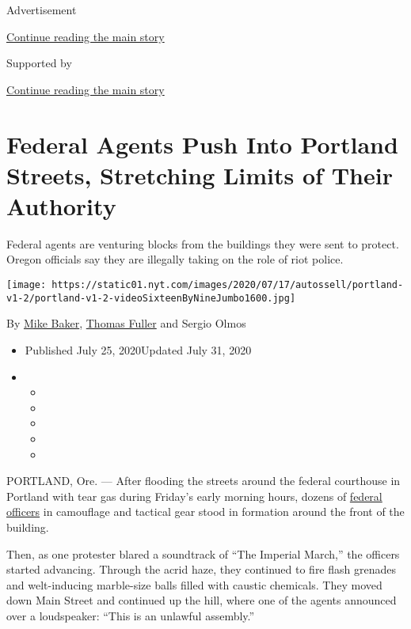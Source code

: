 Advertisement

\protect\hyperlink{after-top}{Continue reading the main story}

Supported by

\protect\hyperlink{after-sponsor}{Continue reading the main story}

\hypertarget{federal-agents-push-into-portland-streets-stretching-limits-of-their-authority}{%
\section{Federal Agents Push Into Portland Streets, Stretching Limits of
Their
Authority}\label{federal-agents-push-into-portland-streets-stretching-limits-of-their-authority}}

Federal agents are venturing blocks from the buildings they were sent to
protect. Oregon officials say they are illegally taking on the role of
riot police.

\texttt{[image: https://static01.nyt.com/images/2020/07/17/autossell/portland-v1-2/portland-v1-2-videoSixteenByNineJumbo1600.jpg]}

By \href{https://www.nytimes.com/by/mike-baker}{Mike Baker},
\href{https://www.nytimes.com/by/thomas-fuller}{Thomas Fuller} and
Sergio Olmos

\begin{itemize}
\item
  Published July 25, 2020Updated July 31, 2020
\item
  \begin{itemize}
  \item
  \item
  \item
  \item
  \item
  \end{itemize}
\end{itemize}

PORTLAND, Ore. --- After flooding the streets around the federal
courthouse in Portland with tear gas during Friday's early morning
hours, dozens of
\href{https://www.nytimes.com/2020/07/30/nyregion/nypd-protester-van.html}{federal
officers} in camouflage and tactical gear stood in formation around the
front of the building.

Then, as one protester blared a soundtrack of ``The Imperial March,''
the officers started advancing. Through the acrid haze, they continued
to fire flash grenades and welt-inducing marble-size balls filled with
caustic chemicals. They moved down Main Street and continued up the
hill, where one of the agents announced over a loudspeaker: ``This is an
unlawful assembly.''

